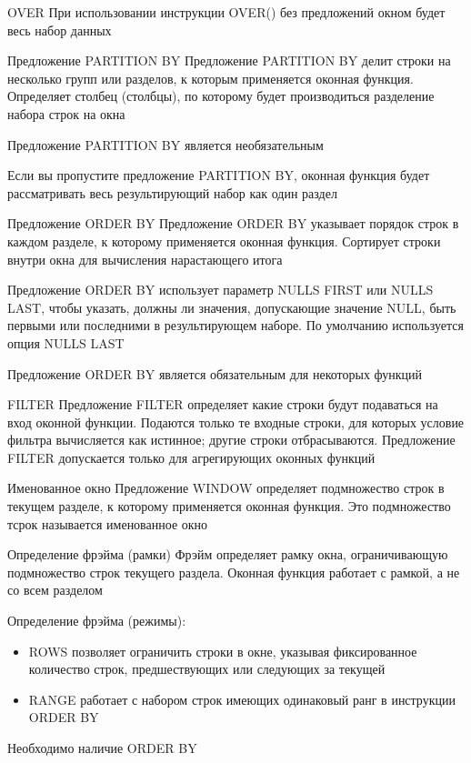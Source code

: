 \documentclass[12pt]{article}
\begin{document}
\begin{defin}{OVER}
    При использовании инструкции OVER() без предложений окном будет весь набор данных 
\end{defin}

\begin{defin}{Предложение PARTITION BY}
    Предложение PARTITION BY делит строки на несколько групп или разделов, к которым применяется оконная функция. Определяет столбец (столбцы), по которому будет производиться разделение набора строк на окна 

    Предложение PARTITION BY является необязательным 

    Если вы пропустите предложение PARTITION BY, оконная функция будет рассматривать весь результирующий набор как один раздел 
\end{defin}

\begin{defin}{Предложение ORDER BY}
    Предложение ORDER BY указывает порядок строк в каждом разделе, к которому применяется оконная функция. Сортирует строки внутри окна для вычисления нарастающего итога 

    Предложение ORDER BY использует параметр NULLS FIRST или NULLS LAST, чтобы указать, должны ли значения, допускающие значение NULL, быть первыми или последними в результирующем наборе. По умолчанию используется опция NULLS LAST

    Предложение ORDER BY является обязательным для некоторых функций 
\end{defin}

\begin{defin}{FILTER}
    Предложение FILTER определяет какие строки будут подаваться на вход оконной функции. Подаются только те входные строки, для которых условие фильтра вычисляется как истинное; другие строки отбрасываются. Предложение FILTER допускается только для агрегирующих оконных функций 
\end{defin}

\begin{defin}{Именованное окно}
    Предложение WINDOW определяет подмножество строк в текущем разделе, к которому применяется оконная функция. Это подмножество тсрок называется именованное окно
\end{defin}

\begin{nota}{Определение фрэйма (рамки)}
    Фрэйм определяет рамку окна, ограничивающую подмножество строк текущего раздела. Оконная функция работает с рамкой, а не со всем разделом

    Определение фрэйма (режимы):

    \begin{itemize}
        \item ROWS позволяет ограничить строки в окне, указывая фиксированное количество строк, предшествующих или следующих за текущей 
        \item RANGE работает с набором строк имеющих одинаковый ранг в инструкции ORDER BY
    \end{itemize}

    Необходимо наличие ORDER BY 
\end{nota}
\end{document}

